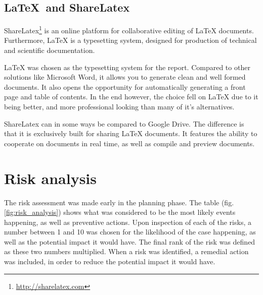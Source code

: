 \subsection{LaTeX\ and ShareLatex}
\label{subsec:prestudies-tools-latex_and_sharelatex}

ShareLatex\footnote{\url{http://sharelatex.com}} is an online platform for collaborative editing of LaTeX documents. Furthermore, LaTeX is a typesetting system, designed for production of technical and scientific documentation.

LaTeX was chosen as the typesetting system for the report. Compared to other solutions like Microsoft Word, it allows you to generate clean and well formed documents. It also opens the opportunity for automatically generating a front page and table of contents. In the end however, the choice fell on LaTeX due to it being better, and more professional looking than many of it's alternatives.

ShareLatex can in some ways be compared to Google Drive. The difference is that it is exclusively built for sharing LaTeX documents. It features the ability to cooperate on documents in real time, as well as compile and preview documents.

\section{Risk analysis}
\label{sec:prestudies-risk_analysis}

The risk assessment was made early in the planning phase. The table (fig. \ref{fig:risk_analysis}) shows what was considered to be the most likely events happening, as well as preventive actions. Upon inspection of each of the risks, a number between 1 and 10 was chosen for the likelihood of the case happening, as well as the potential impact it would have. The final rank of the risk was defined as these two numbers multiplied. When a risk was identified, a remedial action was included, in order to reduce the potential impact it would have.

